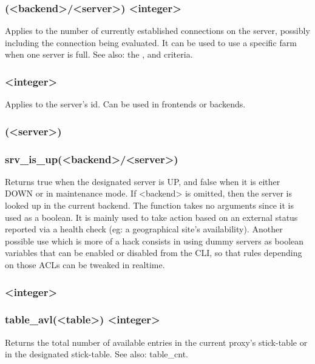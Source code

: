 \subsubsection[srv\_conn]{ (<backend>/<server>) <integer>}

Applies to the number of currently established connections on the server,
possibly including the connection being evaluated.
It can be used to use a specific farm when one server is full.
See also: the ,  and  criteria.

\subsubsection[srv\_id]{ <integer>}

Applies to the server's id. Can be used in frontends or backends.

\subsubsection[srv\_is\_up]{ (<server>)}
\subsubsection*{srv\_is\_up(<backend>/<server>)}

Returns true when the designated server is UP, and false when it is either
DOWN or in maintenance mode. If <backend> is omitted, then the server is
looked up in the current backend. The function takes no arguments since it
is used as a boolean. It is mainly used to take action based on an external
status reported via a health check (eg: a geographical site's availability).
Another possible use which is more of a hack consists in using dummy servers
as boolean variables that can be enabled or disabled from the CLI, so that
rules depending on those ACLs can be tweaked in realtime.

\subsubsection[table\_avl]{ <integer>}
\subsubsection*{table\_avl(<table>) <integer>}

Returns the total number of available entries in the current proxy's
stick-table or in the designated stick-table. See also: table\_cnt.

